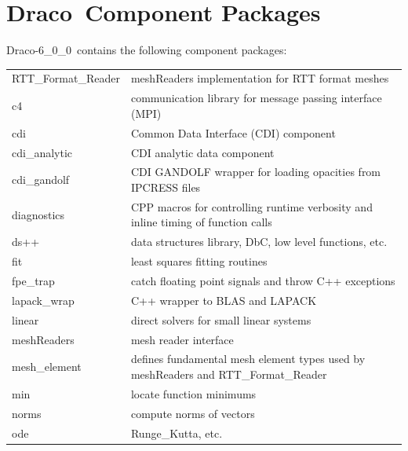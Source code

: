 \documentclass[note]{ResearchNote}
\newcommand{\draco}{Draco}
\newcommand{\dracor}{\draco-6\_0\_0}
\newcommand{\tableText}[1]{{\raggedright #1}}
\begin{document}
\newpage

\section{\draco\ Component Packages}

\dracor\ contains the following component packages:
\begin{center}
  \footnotesize
  \begin{tabular}{lp{4.0in}}
    \hline\hline 

    \textsf{RTT\_Format\_Reader} & \tableText{\textsf{meshReaders}
      implementation for RTT format meshes} \\
    \textsf{c4} & \tableText{communication library for message passing interface (MPI)} \\
    \textsf{cdi} & \tableText{Common Data Interface (CDI) component} \\
    \textsf{cdi\_analytic} & \tableText{CDI analytic data component} \\
    \textsf{cdi\_gandolf} & \tableText{CDI GANDOLF wrapper for loading
    opacities from IPCRESS files} \\
    \textsf{diagnostics}  & \tableText{CPP macros for controlling runtime
      verbosity and inline timing of function calls} \\
    \textsf{ds++}         & \tableText{data structures library, DbC,
      low level functions, etc.} \\
    \textsf{fit}          & \tableText{least squares fitting routines} \\
    \textsf{fpe\_trap}    & \tableText{catch floating point signals and throw
      C++ exceptions} \\
    \textsf{lapack\_wrap} & \tableText{C++ wrapper to BLAS and LAPACK} \\
    \textsf{linear}       & \tableText{direct solvers for small linear systems} \\
    \textsf{meshReaders}  & \tableText{mesh reader interface} \\
    \textsf{mesh\_element} & \tableText{defines fundamental mesh element types
      used by meshReaders and RTT\_Format\_Reader} \\
    \textsf{min}          & \tableText{locate function minimums} \\
    \textsf{norms}        & \tableText{compute norms of vectors} \\
    \textsf{ode}          & \tableText{Runge\_Kutta, etc.} \\

\end{tabular}
\end{center}
\end{document}
